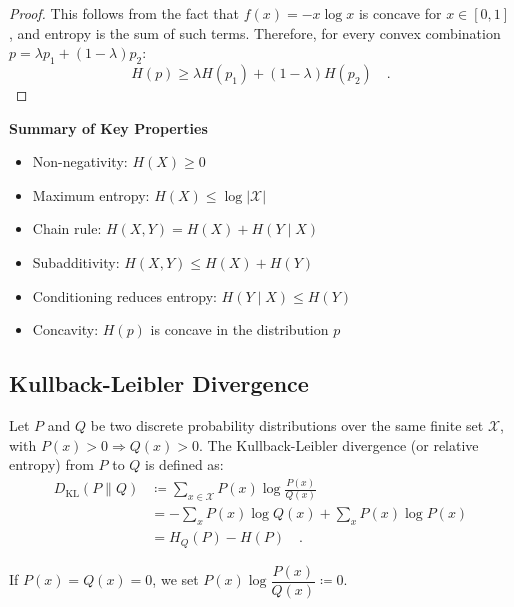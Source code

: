 \documentclass[../../main.tex]{subfiles}
\begin{document}
\begin{proof}
    This follows from the fact that \( f(x) = -x \log x \) is concave for \( x \in [0, 1] \), and entropy is the sum of such terms. Therefore, for every convex combination \( p = \lambda p_1 + (1 - \lambda)p_2 \):
    \[
        H(p) \geq \lambda H(p_1) + (1 - \lambda) H(p_2) \quad .
    \]
\end{proof}

\textbf{Summary of Key Properties}
\begin{itemize}[leftmargin=1.2cm]
    \item Non-negativity: \( H(X) \geq 0 \)
    \item Maximum entropy: \( H(X) \leq \log |\mathcal{X}| \)
    \item Chain rule: \( H(X, Y) = H(X) + H(Y \mid X) \)
    \item Subadditivity: \( H(X, Y) \leq H(X) + H(Y) \)
    \item Conditioning reduces entropy: \( H(Y \mid X) \leq H(Y) \)
    \item Concavity: \( H(p) \) is concave in the distribution \( p \)
\end{itemize}

\pagebreak
\subsection{Kullback-Leibler Divergence}
\label{sec:kullback_leibler_divergence}

\begin{definition}[KL Divergence]
    Let \( P \) and \( Q \) be two discrete probability distributions over the same finite set \( \mathcal{X} \), with \( P(x) > 0 \Rightarrow Q(x) > 0 \). The Kullback-Leibler divergence (or relative entropy) from \( P \) to \( Q \) is defined as:
    \begin{align*}
        D_{\mathrm{KL}}(P \| Q) 
        &\coloneqq \sum_{x \in \mathcal{X}} P(x) \log \frac{P(x)}{Q(x)} \\
        &= - \sum_{x} P(x) \log Q(x) + \sum_{x} P(x) \log P(x) \\
        &= H_Q(P) - H(P) \quad .
    \end{align*}

\end{definition}

\begin{remark}
    If $P(x) = Q(x) = 0$, we set $P(x) \log \dfrac{P(x)}{Q(x)} \coloneqq 0$.
\end{remark}
\end{document}

